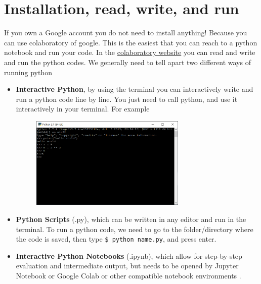\documentclass[10pt,a4paper]{article}
\begin{document}
\section{Installation, read, write, and run}
If you own a Google account you do not need to install anything! Because you can use colaboratory of google. This is the easiest that you can reach to a python notebook and run your code.
In the   \href{https://colab.research.google.com}{colaboratory website}  you can read and write and run the python codes.
We generally need to tell apart two different ways of running python
\begin{itemize}
\item \textbf{Interactive Python}, by using the terminal you can interactively write and run a python code line by line. You just need to call python, and use it interactively in your terminal. For example
\begin{figure}[htbp]\centering
\includegraphics[width=0.7\textwidth]{interactive-python-terminal.PNG}
\end{figure}
\item \textbf{Python Scripts} (.py), which can be written in any editor and run in the terminal. To run a python code, we need to go to the folder/directory where the code is saved, then type \texttt{\$ python name.py}, and press enter. 
\item \textbf{Interactive Python Notebooks} (.ipynb), which allow for step-by-step evaluation and intermediate output, but needs to be opened by Jupyter Notebook or Google Colab or other compatible notebook environments .
\end{itemize}
\end{document}
